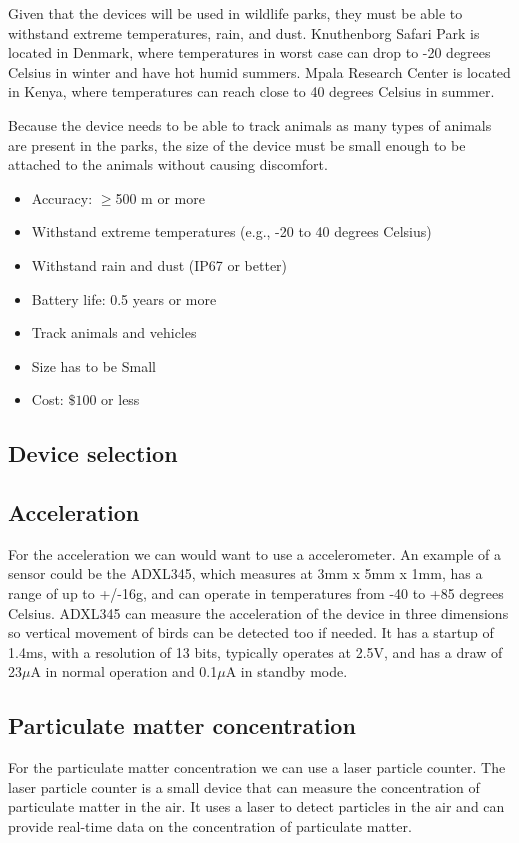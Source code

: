 Given that the devices will be used in wildlife parks, they must be able to withstand extreme temperatures, rain, and dust. Knuthenborg Safari Park is located in Denmark, where temperatures in worst case can drop to -20 degrees Celsius in winter and have hot humid summers. Mpala Research Center is located in Kenya, where temperatures can reach close to 40 degrees Celsius in summer. 

Because the device needs to be able to track animals as many types of animals are present in the parks, the size of the device must be small enough to be attached to the animals without causing discomfort. 

\begin{itemize}
  \item Accuracy: $\geq$500 m or more
  \item Withstand extreme temperatures (e.g., -20 to 40 degrees Celsius)
  \item Withstand rain and dust (IP67 or better)
  \item Battery life: 0.5 years or more
  \item Track animals and vehicles
  \item Size has to be Small
  \item Cost: $\mathdollar100$ or less
\end{itemize}


\subsection{Device selection}

\subsection{Acceleration}
For the acceleration we can would want to use a accelerometer. An example of a sensor could be the ADXL345, which measures at 3mm x 5mm x 1mm, has a range of up to +/-16g, and can operate in temperatures from -40 to +85 degrees Celsius. ADXL345 can measure the acceleration of the device in three dimensions so vertical movement of birds can be detected too if needed. It has a startup of 1.4ms, with a resolution of 13 bits, typically operates at 2.5V, and has a draw of 23$\mu$A in normal operation and 0.1$\mu$A in standby mode.

\subsection{Particulate matter concentration}
For the particulate matter concentration we can use a laser particle counter. The laser particle counter is a small device that can measure the concentration of particulate matter in the air. It uses a laser to detect particles in the air and can provide real-time data on the concentration of particulate matter.

